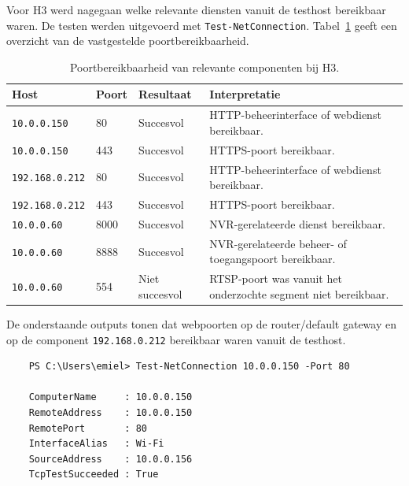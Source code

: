 Voor H3 werd nagegaan welke relevante diensten vanuit de testhost bereikbaar waren. De testen werden uitgevoerd met \texttt{Test-NetConnection}. Tabel~\ref{tab:bewijs-h3-poorten} geeft een overzicht van de vastgestelde poortbereikbaarheid.

\begin{table}[H]
    \centering
    \small
    \caption[Poortbereikbaarheid bij H3]{Poortbereikbaarheid van relevante componenten bij H3.}
    \label{tab:bewijs-h3-poorten}
    \begin{tabular}{p{}p{}p{}p{}}
        \hline
        \textbf{Host} & \textbf{Poort} & \textbf{Resultaat} & \textbf{Interpretatie} \\
        \hline
        \texttt{10.0.0.150} & 80 & Succesvol & HTTP-beheerinterface of webdienst bereikbaar. \\
        \hline
        \texttt{10.0.0.150} & 443 & Succesvol & HTTPS-poort bereikbaar. \\
        \hline
        \texttt{192.168.0.212} & 80 & Succesvol & HTTP-beheerinterface of webdienst bereikbaar. \\
        \hline
        \texttt{192.168.0.212} & 443 & Succesvol & HTTPS-poort bereikbaar. \\
        \hline
        \texttt{10.0.0.60} & 8000 & Succesvol & NVR-gerelateerde dienst bereikbaar. \\
        \hline
        \texttt{10.0.0.60} & 8888 & Succesvol & NVR-gerelateerde beheer- of toegangspoort bereikbaar. \\
        \hline
        \texttt{10.0.0.60} & 554 & Niet succesvol & RTSP-poort was vanuit het onderzochte segment niet bereikbaar. \\
        \hline
    \end{tabular}
\end{table}

De onderstaande outputs tonen dat webpoorten op de router/default gateway en op de component \texttt{192.168.0.212} bereikbaar waren vanuit de testhost.

\begin{verbatim}
    PS C:\Users\emiel> Test-NetConnection 10.0.0.150 -Port 80
    
    ComputerName     : 10.0.0.150
    RemoteAddress    : 10.0.0.150
    RemotePort       : 80
    InterfaceAlias   : Wi-Fi
    SourceAddress    : 10.0.0.156
    TcpTestSucceeded : True
\end{verbatim}

